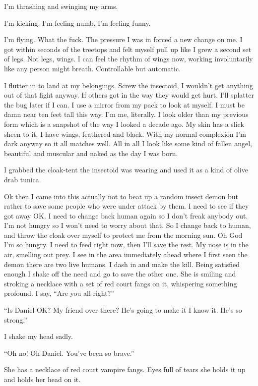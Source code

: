 I'm thrashing and swinging my arms.

I'm kicking. I'm feeling numb. I'm feeling funny.

I'm flying. What the fuck. The pressure I was in forced a new change on me. I got within seconds of the treetops and felt myself pull up like I grew a second set of legs. Not legs, wings. I can feel the rhythm of wings now, working involuntarily like any person might breath. Controllable but automatic.

I flutter in to land at my belongings. Screw the insectoid, I wouldn't get anything out of that fight anyway. If others got in the way they would get hurt. I'll splatter the bug later if I can. I use a mirror from my pack to look at myself. I must be damn near ten feet tall this way. I'm me, literally. I look older than my previous form which is a snapshot of the way I looked a decade ago. My skin has a slick sheen to it. I have wings, feathered and black. With my normal complexion I'm dark anyway so it all matches well. All in all I look like some kind of fallen angel, beautiful and muscular and naked as the day I was born.

I grabbed the cloak-tent the insectoid was wearing and used it as a kind of olive drab tunica.

Ok then I came into this actually not to beat up a random insect demon but rather to save some people who were under attack by them. I need to see if they got away OK.
I need to change back human again so I don't freak anybody out. I'm not hungry so I won't need to worry about that.
So I change back to human, and throw the cloak over myself to protect me from the morning sun. Oh God I'm so hungry.
I need to feed right now, then I'll save the rest.
My nose is in the air, smelling out prey. I see in the area immediately ahead where I first seen the demon there are two live humans.
I dash in and make the kill. Being satisfied enough I shake off the need and go to save the other one. She is smiling and stroking a necklace with a set of red court fangs on it, whispering something profound. I say, ``Are you all right?''

``Is Daniel OK? My friend over there? He's going to make it I know it. He's so strong.''

I shake my head sadly.

``Oh no! Oh Daniel. You've been so brave.''

She has a necklace of red court vampire fangs. Eyes full of tears she holds it up and holds her head on it.

